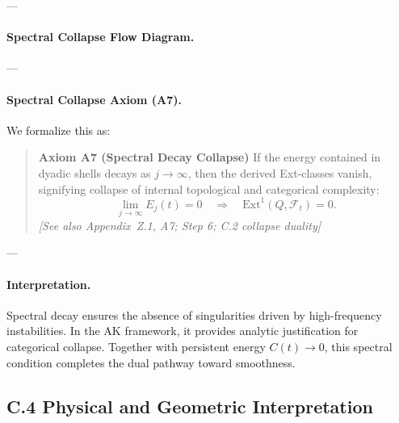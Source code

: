 \documentclass[11pt]{article}
\begin{document}
---

\paragraph{Spectral Collapse Flow Diagram.}

\begin{center}
\end{center}

---

\paragraph{Spectral Collapse Axiom (A7).}
We formalize this as:

\begin{quote}
\textbf{Axiom A7 (Spectral Decay Collapse)}  
If the energy contained in dyadic shells decays as \( j \to \infty \),  
then the derived Ext-classes vanish, signifying collapse of internal topological and categorical complexity:
\[
\lim_{j \to \infty} E_j(t) = 0 
\quad \Rightarrow \quad 
\mathrm{Ext}^1(Q, \mathcal{F}_t) = 0.
\]
\textit{[See also Appendix~Z.1, A7; Step 6; C.2 collapse duality]}
\end{quote}

---

\paragraph{Interpretation.}
Spectral decay ensures the absence of singularities driven by high-frequency instabilities.  
In the AK framework, it provides analytic justification for categorical collapse.  
Together with persistent energy \( C(t) \to 0 \), this spectral condition completes the dual pathway toward smoothness.



\subsection*{C.4 Physical and Geometric Interpretation}
\end{document}
